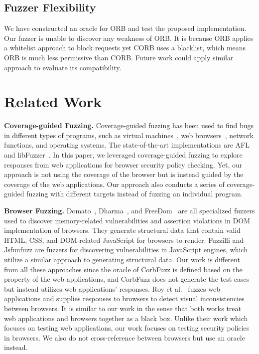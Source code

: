 \documentclass[10pt,conference]{IEEEtran}
\begin{document}
\subsection{Fuzzer Flexibility}
We have constructed an oracle for ORB and test the proposed implementation. Our fuzzer is unable to discover any weakness of ORB. It is because ORB applies a whitelist approach to block requests yet CORB uses a blacklist, which means ORB is much less permissive than CORB. Future work could apply similar approach to evaluate its compatibility. 


\section{Related Work}
\label{sec:related-work}

\textbf{Coverage-guided Fuzzing.}
Coverage-guided fuzzing has been used to find bugs in different types of programs, such as virtual machines~\cite{jvmfuzz}, web browsers~\cite{xu_freedom:_2020,noauthor_fuzzilli_2021}, network functions\cite{p4rl, porkfuzz}, and operating systems\cite{kim_finding_2019,kim_hfl:_2020}. The state-of-the-art implementations are AFL~\cite{AFL} and libFuzzer~\cite{libfuzzer}.
In this paper, we leveraged coverage-guided fuzzing to explore responses from web applications for browser security policy checking. Yet, our approach is not using the coverage of the browser but is instead guided by the coverage of the web applications. Our approach also conducts a series of coverage-guided fuzzing with different targets instead of fuzzing an individual program.


\textbf{Browser Fuzzing.} 
Domato~\cite{noauthor_domato_2021}, Dharma~\cite{noauthor_dharma_2021}, and FreeDom~\cite{xu_freedom:_2020} are all specialized fuzzers used to discover memory-related vulnerabilities and assertion violations in DOM implementation of browsers. They generate structural data that contain valid HTML, CSS, and DOM-related JavaScript for browsers to render. Fuzzilli\cite{noauthor_fuzzilli_2021} and Jsfunfuzz\cite{noauthor_collection_2021} are fuzzers for discovering vulnerabilities in JavaScript engines, which utilize a similar approach to generating structural data. Our work is different from all these approaches since the oracle of CorbFuzz is defined based on the property of the web applications, and CorbFuzz does not generate the test cases but instead utilizes web applications' responses. 
Roy et al.~\cite{roy2014x} fuzzes web applications and supplies responses to browsers to detect visual inconsistencies between browsers. It is similar to our work in the sense that both works treat web applications and browsers together as a black box. Unlike their work which focuses on testing web applications, our work focuses on testing security policies in browsers. We also do not cross-reference between browsers but use an oracle instead. %
\end{document}
